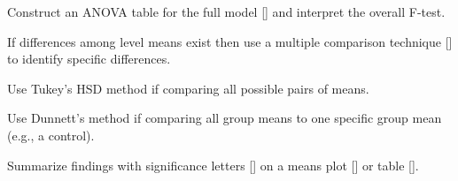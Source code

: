 \documentclass[10pt,openany]{book}\usepackage[]{graphicx}\usepackage[]{color}
\begin{document}
\begin{Enumerate}
\begin{Itemize}
    \end{Itemize}
  \item Construct an ANOVA table for the full model [] and interpret the overall F-test.
  \item If differences among level means exist then use a multiple comparison technique [] to identify specific differences.
    \begin{Itemize}
      \item Use Tukey's HSD method if comparing all possible pairs of means.
      \item Use Dunnett's method if comparing all group means to one specific group mean (e.g., a control).
    \end{Itemize}
  \item Summarize findings with significance letters [] on a means plot [] or table [].
\end{Enumerate}
\end{document}
